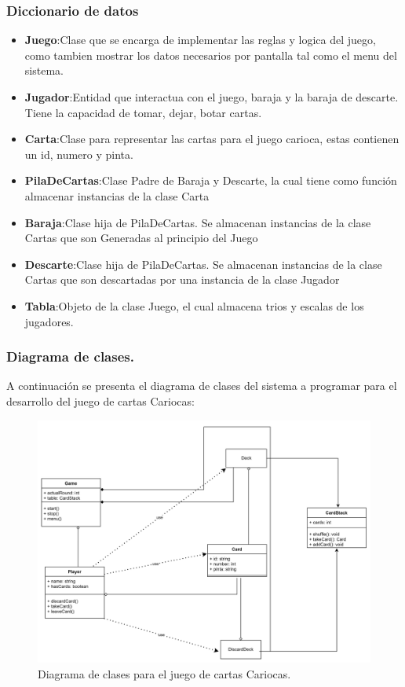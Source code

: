 \documentclass[60pt]{article}
\begin{document}
\subsubsection{Diccionario de datos}\label{cap:diccionario-datos}
\begin{itemize}
    \item\textbf{Juego}:Clase que se encarga de implementar las reglas y logica del juego, \\como tambien mostrar los datos necesarios por pantalla tal como el menu del sistema. 
    \item\textbf{Jugador}:Entidad que interactua con el juego, baraja y la baraja de descarte. Tiene la capacidad de tomar, dejar, botar cartas.
    \item\textbf{Carta}:Clase para representar las cartas para el juego carioca, estas contienen un id, numero y pinta.
    \item\textbf{PilaDeCartas}:Clase Padre de Baraja y Descarte, la cual tiene como función almacenar instancias de la clase Carta
    \item\textbf{Baraja}:Clase hija de PilaDeCartas. Se almacenan instancias de la clase Cartas que son Generadas al principio del Juego
    \item\textbf{Descarte}:Clase hija de PilaDeCartas. Se almacenan instancias de la clase Cartas que son descartadas por una instancia de la clase Jugador
    \item\textbf{Tabla}:Objeto de la clase Juego, el cual almacena trios y escalas de los jugadores. 
\end{itemize}
\clearpage
\subsubsection{Diagrama de clases.}\label{cap:diagrama-clases}
A continuación se presenta el diagrama de clases del sistema a programar para el desarrollo del juego de cartas Cariocas:
\begin{figure}[H]
    \centering
    \includegraphics[width=15cm]{diclass.png}
    \caption{Diagrama de clases para el juego de cartas Cariocas.}
\end{figure}
\end{document}

